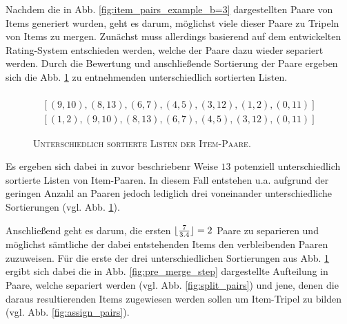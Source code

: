 Nachdem die in Abb. \ref{fig:item_pairs_example_b=3} dargestellten Paare von Items generiert wurden, geht es darum,
möglichst viele dieser Paare zu Tripeln von Items zu mergen. Zunächst muss allerdings basierend auf dem entwickelten Rating-System
entschieden werden, welche der Paare dazu wieder separiert werden. Durch die Bewertung und anschließende Sortierung der Paare
ergeben sich die Abb. \ref{fig:lists_of_pairs} zu entnehmenden unterschiedlich sortierten Listen.
\begin{figure}[H]
\begin{gather*}
  [(1, 2), (3, 12), (9, 10), (8, 13), (6, 7), (4, 5), (0, 11)] \\
  [(9, 10), (8, 13), (6, 7), (4, 5), (3, 12), (1, 2), (0, 11)] \\
  [(1, 2), (9, 10), (8, 13), (6, 7), (4, 5), (3, 12), (0, 11)]
\end{gather*}
\caption{\textsc{Unterschiedlich sortierte Listen der Item-Paare}.}
\label{fig:lists_of_pairs}
\end{figure}
Es ergeben sich dabei in zuvor beschriebenr Weise $13$ potenziell unterschiedlich sortierte Listen von Item-Paaren.
In diesem Fall entstehen u.a. aufgrund der geringen Anzahl an Paaren jedoch lediglich drei voneinander unterschiedliche
Sortierungen (vgl. Abb. \ref{fig:lists_of_pairs}).

Anschließend geht es darum, die ersten $\lfloor\frac{7}{3.4}\rfloor = 2$ Paare zu separieren und möglichst sämtliche der dabei entstehenden
Items den verbleibenden Paaren zuzuweisen. Für die erste der drei unterschiedlichen Sortierungen aus Abb. \ref{fig:lists_of_pairs}
ergibt sich dabei die in Abb. \ref{fig:pre_merge_step} dargestellte Aufteilung in Paare, welche separiert werden
(vgl. Abb. \ref{fig:split_pairs}) und jene, denen die daraus resultierenden Items zugewiesen werden sollen um Item-Tripel zu bilden
(vgl. Abb. \ref{fig:assign_pairs}).

